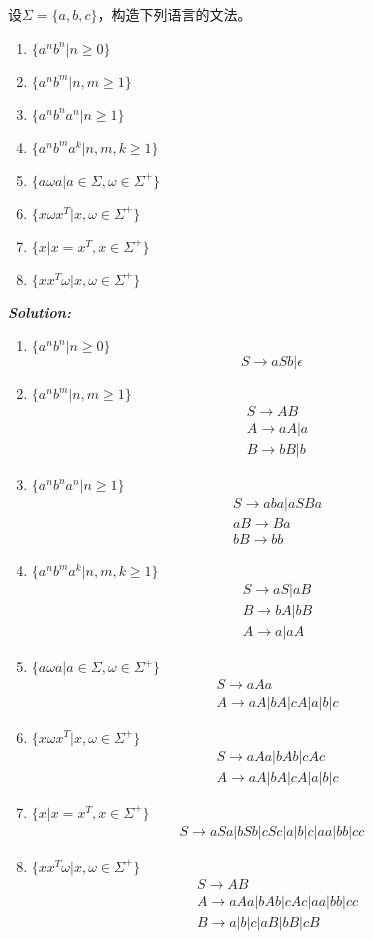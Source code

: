 \documentclass[a4paper]{ctexart}
\begin{document}
 设$\Sigma=\{a,b,c\}$，构造下列语言的文法。
\begin{enumerate}[(1)]
\item $\{a^nb^n |n\geq 0\}$
\item $\{a^nb^m|n,m\geq 1\}$
\item $\{a^nb^na^n|n\geq 1\}$
\item $\{a^nb^ma^k | n,m,k\geq 1\}$
\item $\{a\omega a |a\in \Sigma,\omega \in \Sigma^+\}$
\item $\{x\omega x^T|x,\omega\in \Sigma^+\}$
\item $\{x|x=x^T,x\in \Sigma^+\}$
\item $\{xx^T\omega |x,\omega \in\Sigma^+\}$
\end{enumerate}
\textbf{\emph{Solution:}}
\begin{enumerate}[(1)]
\item $\{a^nb^n |n\geq 0\}$
\[
S\to aSb|\epsilon
\]   
\item $\{a^nb^m|n,m\geq 1\}$
\[
\begin{split}
&S\to AB\\
&A\to aA|a\\
&B\to bB|b
\end{split}
\]
\item $\{a^nb^na^n|n\geq 1\}$
\[
\begin{split}
&S\to aba|aSBa\\
&aB\to Ba\\
&bB\to bb
\end{split}
\]
\item $\{a^nb^ma^k | n,m,k\geq 1\}$
\[
\begin{split}
&S\to aS|aB\\
&B\to bA|bB\\
&A\to a|aA
\end{split}
\]
\item $\{a\omega a |a\in \Sigma,\omega \in \Sigma^+\}$
\[
\begin{split}
&S\to aAa\\
&A\to aA|bA|cA|a|b|c
\end{split}
\]
\item $\{x\omega x^T|x,\omega\in \Sigma^+\}$
\[
\begin{split}
&S\to aAa|bAb|cAc\\
&A\to aA|bA|cA|a|b|c
\end{split}
\]
\item $\{x|x=x^T,x\in \Sigma^+\}$
\[
\begin{split}
S\to aSa|bSb|cSc|a|b|c|aa|bb|cc
\end{split}
\]
\item $\{xx^T\omega |x,\omega \in\Sigma^+\}$
\[
\begin{split}
&S\to AB\\
&A\to aAa|bAb|cAc|aa|bb|cc\\
&B\to a|b|c|aB|bB|cB
\end{split}
\]
\end{enumerate}
\end{document}
